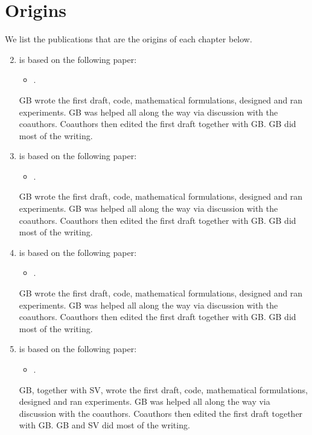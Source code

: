 
\section{Origins}
\label{section:introduction:origins}

We list the publications that are the origins of each chapter below.

\begin{enumerate}[label=\textbf{Chapter~\arabic*},align=left]
\setcounter{enumi}{1}

\item is based on the following paper:
\begin{itemize}
\item {}.
\end{itemize}
GB wrote the first draft, code, mathematical formulations, designed and ran experiments. GB was helped all along the way via discussion with the coauthors. Coauthors then edited the first draft together with GB. GB did most of the writing.

\item is based on the following paper:
\begin{itemize}
\item {}.
\end{itemize}
GB wrote the first draft, code, mathematical formulations, designed and ran experiments. GB was helped all along the way via discussion with the coauthors. Coauthors then edited the first draft together with GB. GB did most of the writing.

\item is based on the following paper:
\begin{itemize}
\item {}.
\end{itemize}
GB wrote the first draft, code, mathematical formulations, designed and ran experiments. GB was helped all along the way via discussion with the coauthors. Coauthors then edited the first draft together with GB. GB did most of the writing.

\item is based on the following paper:
\begin{itemize}
\item {}.
\end{itemize}
GB, together with SV, wrote the first draft, code, mathematical formulations, designed and ran experiments. GB was helped all along the way via discussion with the coauthors. Coauthors then edited the first draft together with GB. GB and SV did most of the writing.


\end{enumerate}

